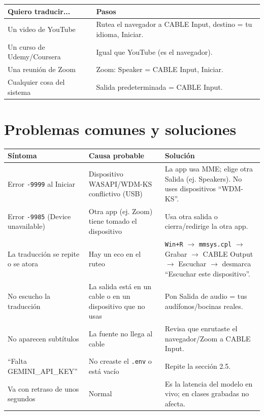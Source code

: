 \documentclass[11pt,a4paper]{article}
\begin{document}
\begin{tabularx}{\textwidth}{@{}l Y@{}}
\toprule
\textbf{Quiero traducir...} & \textbf{Pasos} \\
\midrule
Un video de YouTube & Rutea el navegador a CABLE Input, destino = tu idioma, Iniciar. \\
Un curso de Udemy/Coursera & Igual que YouTube (es el navegador). \\
Una reunión de Zoom & Zoom: Speaker = CABLE Input, Iniciar. \\
Cualquier cosa del sistema & Salida predeterminada = CABLE Input. \\
\bottomrule
\end{tabularx}

\section{Problemas comunes y soluciones}

\begin{tabularx}{\textwidth}{@{}l Y Y@{}}
\toprule
\textbf{Síntoma} & \textbf{Causa probable} & \textbf{Solución} \\
\midrule
Error \texttt{-9999} al Iniciar & Dispositivo WASAPI/WDM-KS conflictivo (USB) & La app usa MME; elige otra Salida (ej. Speakers). No uses dispositivos ``WDM-KS''. \\
\addlinespace
Error \texttt{-9985} (Device unavailable) & Otra app (ej. Zoom) tiene tomado el dispositivo & Usa otra salida o cierra/redirige la otra app. \\
\addlinespace
La traducción se repite o se atora & Hay un eco en el ruteo & \texttt{Win+R} $\rightarrow$ \texttt{mmsys.cpl} $\rightarrow$ Grabar $\rightarrow$ CABLE Output $\rightarrow$ Escuchar $\rightarrow$ desmarca ``Escuchar este dispositivo''. \\
\addlinespace
No escucho la traducción & La salida está en un cable o en un dispositivo que no usas & Pon Salida de audio = tus audífonos/bocinas reales. \\
\addlinespace
No aparecen subtítulos & La fuente no llega al cable & Revisa que enrutaste el navegador/Zoom a CABLE Input. \\
\addlinespace
``Falta GEMINI\_API\_KEY'' & No creaste el \texttt{.env} o está vacío & Repite la sección 2.5. \\
\addlinespace
Va con retraso de unos segundos & Normal & Es la latencia del modelo en vivo; en clases grabadas no afecta. \\
\bottomrule
\end{tabularx}
\end{document}
